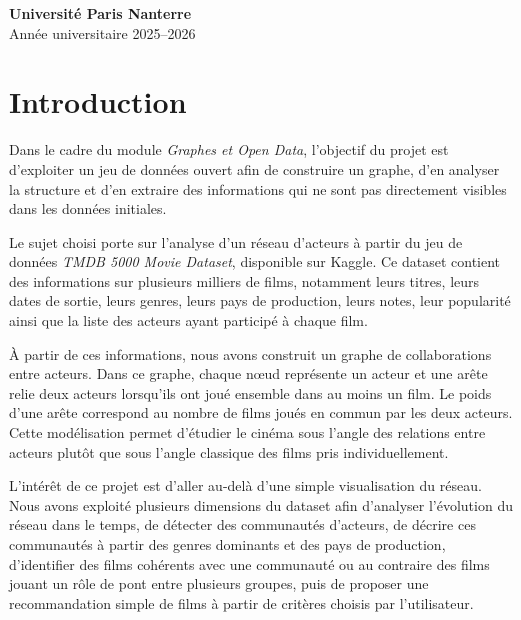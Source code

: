 \documentclass[11pt,a4paper,oneside,openany]{report}
\begin{document}
\begin{titlepage}
\vspace{0.55cm}

\begin{center}
{\Large\bfseries\color{bleunanterre}Université Paris Nanterre}\\[0.15cm]
{\large Année universitaire 2025--2026}
\end{center}

\end{titlepage}

\tableofcontents
\clearpage

\chapter{Introduction}

Dans le cadre du module \textit{Graphes et Open Data}, l’objectif du projet est d’exploiter un jeu de données ouvert afin de construire un graphe, d’en analyser la structure et d’en extraire des informations qui ne sont pas directement visibles dans les données initiales.

Le sujet choisi porte sur l’analyse d’un réseau d’acteurs à partir du jeu de données \textit{TMDB 5000 Movie Dataset}, disponible sur Kaggle. Ce dataset contient des informations sur plusieurs milliers de films, notamment leurs titres, leurs dates de sortie, leurs genres, leurs pays de production, leurs notes, leur popularité ainsi que la liste des acteurs ayant participé à chaque film.

À partir de ces informations, nous avons construit un graphe de collaborations entre acteurs. Dans ce graphe, chaque nœud représente un acteur et une arête relie deux acteurs lorsqu’ils ont joué ensemble dans au moins un film. Le poids d’une arête correspond au nombre de films joués en commun par les deux acteurs. Cette modélisation permet d’étudier le cinéma sous l’angle des relations entre acteurs plutôt que sous l’angle classique des films pris individuellement.

L’intérêt de ce projet est d’aller au-delà d’une simple visualisation du réseau. Nous avons exploité plusieurs dimensions du dataset afin d’analyser l’évolution du réseau dans le temps, de détecter des communautés d’acteurs, de décrire ces communautés à partir des genres dominants et des pays de production, d’identifier des films cohérents avec une communauté ou au contraire des films jouant un rôle de pont entre plusieurs groupes, puis de proposer une recommandation simple de films à partir de critères choisis par l’utilisateur.
\end{document}
